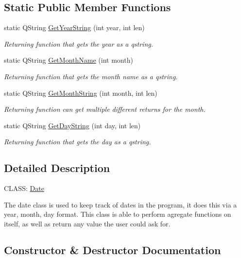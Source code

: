 \subsection*{Static Public Member Functions}
\begin{DoxyCompactItemize}
\item 
static Q\+String \hyperlink{class_date_a4a576d12ee2c2bd0b875db256f4ab712}{Get\+Year\+String} (int year, int len)
\begin{DoxyCompactList}\small\item\em Returning function that gets the year as a qstring. \end{DoxyCompactList}\item 
static Q\+String \hyperlink{class_date_afb4c730486917f56dce2b9bdd08461cc}{Get\+Month\+Name} (int month)
\begin{DoxyCompactList}\small\item\em Returning function that gets the month name as a qstring. \end{DoxyCompactList}\item 
static Q\+String \hyperlink{class_date_ab6f4a84a651f2ac1f60faa6d3b4a43ad}{Get\+Month\+String} (int month, int len)
\begin{DoxyCompactList}\small\item\em Returning function can get multiple different returns for the month. \end{DoxyCompactList}\item 
static Q\+String \hyperlink{class_date_ad320136b5c8f79038d78022befd70f58}{Get\+Day\+String} (int day, int len)
\begin{DoxyCompactList}\small\item\em Returning function that gets the day as a qstring. \end{DoxyCompactList}\end{DoxyCompactItemize}


\subsection{Detailed Description}
C\+L\+A\+SS\+: \hyperlink{class_date}{Date} 

 The date class is used to keep track of dates in the program, it does this via a year, month, day format. This class is able to perform agregate functions on itself, as well as return any value the user could ask for. 

\subsection{Constructor \& Destructor Documentation}
